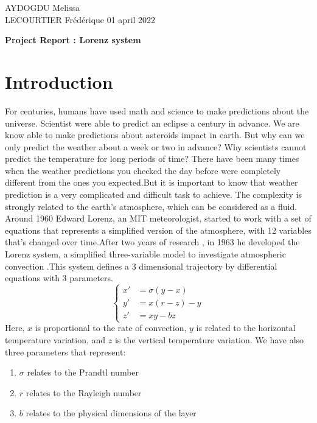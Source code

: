 \documentclass[12pt]{article}
\begin{document}
	AYDOGDU Melissa \\
	LECOURTIER Frédérique \hfill 01 april 2022
	\begin{center}
		\Large\textbf{Project Report : Lorenz system}\\
	\end{center}
	
	\tableofcontents
	
	\section{Introduction}
	For centuries, humans have used math and science to make predictions about the universe. Scientist were able to predict an eclipse a century in advance. We are know able to make predictions about asteroids impact in earth. But why can we only predict the weather about a week or two in advance? Why scientists cannot predict the temperature for long periods of time? There have been many times when the weather predictions you checked the day before were completely different from the ones you expected.But it is important to know that weather prediction is a very complicated and difficult task to achieve. The complexity is strongly related to the earth's atmosphere, which can be considered as a fluid. 
	Around 1960 Edward Lorenz, an MIT meteorologist, started to work with a set of equations that represents a simplified version of the atmosphere, with 12 variables that’s changed over time.After two years of research , in 1963 he developed the Lorenz system, a simplified three-variable model to investigate atmospheric convection .This system defines a 3 dimensional trajectory by differential equations with 3 parameters.
	$$
	\begin{cases}
	    
        x'&=\sigma(y-x) \\
        y'&=x(r-z)-y \\
        z'&=xy-bz
       
    \end{cases}
    $$
    Here, $x$ is proportional to the rate of convection, $y$ is related to the horizontal temperature variation, and $z$ is the vertical temperature variation.
    We have also three parameters that represent:
    \begin{enumerate}[label=\textbullet]
		\item $\sigma$  relates to the Prandtl number
		\item $r$  relates to the Rayleigh number
		\item $b$ relates to the physical dimensions of the layer
	\end{enumerate}
	
\end{document}
